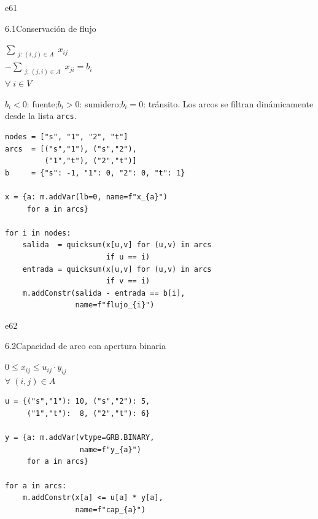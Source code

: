 \documentclass[10pt,a4paper]{article}
\newlength{\mathcolw}
\newlength{\codecolw}
\newcommand{\entryheader}[2][]{%
  \needspace{5cm}%
  \vspace{6pt}%
  \ifx\relax#1\relax\else\phantomsection\hypertarget{#1}{}\fi%
  \noindent%
  \begin{tcolorbox}[
    colback=subsecbg!18,
    colframe=subsecbg!45,
    sharp corners, boxrule=0.4pt,
    left=5pt, right=5pt, top=2pt, bottom=2pt,
    fontupper=\small\bfseries\sffamily,
  ]
  #2
  \end{tcolorbox}%
  \vspace{2pt}%
}
\newcommand{\py}[1]{\texttt{\small #1}}
\begin{document}
\entryheader[e61]{6.1\quad Conservaci\'on de flujo}
\noindent
\begin{minipage}[t]{\mathcolw}
    \begin{tcolorbox}[mathbox]
        $\displaystyle\sum_{\substack{j:\,(i,j)\in A}} x_{ij}$\\[4pt]
        $-\displaystyle\sum_{\substack{j:\,(j,i)\in A}} x_{ji} = b_i$\\[6pt]
        $\forall\; i \in V$
    \end{tcolorbox}
    \vspace{2pt}
    \begin{tcolorbox}[notebox]
        $b_i < 0$: fuente;\enspace $b_i > 0$: sumidero;\enspace $b_i = 0$: tr\'ansito. Los arcos se filtran din\'amicamente desde la lista \py{arcs}.
    \end{tcolorbox}
\end{minipage}\hspace{0.02\textwidth}%
\begin{minipage}[t]{\codecolw}
    \begin{lstlisting}[style=gurobipy]
nodes = ["s", "1", "2", "t"]
arcs  = [("s","1"), ("s","2"),
         ("1","t"), ("2","t")]
b     = {"s": -1, "1": 0, "2": 0, "t": 1}

x = {a: m.addVar(lb=0, name=f"x_{a}")
     for a in arcs}

for i in nodes:
    salida  = quicksum(x[u,v] for (u,v) in arcs
                       if u == i)
    entrada = quicksum(x[u,v] for (u,v) in arcs
                       if v == i)
    m.addConstr(salida - entrada == b[i],
                name=f"flujo_{i}")
\end{lstlisting}
\end{minipage}

\vspace{4pt}

\entryheader[e62]{6.2\quad Capacidad de arco con apertura binaria}
\noindent
\begin{minipage}[t]{\mathcolw}
    \begin{tcolorbox}[mathbox]
        $0 \leq x_{ij} \leq u_{ij} \cdot y_{ij}$\\[6pt]
        $\forall\; (i,j) \in A$
    \end{tcolorbox}
\end{minipage}\hspace{0.02\textwidth}%
\begin{minipage}[t]{\codecolw}
    \begin{lstlisting}[style=gurobipy]
u = {("s","1"): 10, ("s","2"): 5,
     ("1","t"):  8, ("2","t"): 6}

y = {a: m.addVar(vtype=GRB.BINARY,
                 name=f"y_{a}")
     for a in arcs}

for a in arcs:
    m.addConstr(x[a] <= u[a] * y[a],
                name=f"cap_{a}")
\end{lstlisting}
\end{minipage}
\end{document}
